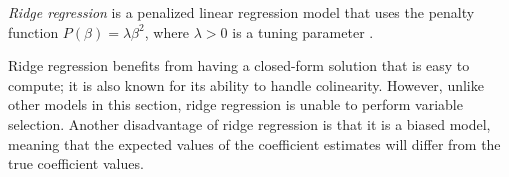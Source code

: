 \documentclass{article}
\newcommand{\argmin}[2]{\underset{#1}{\text{arg min}}\left\{#2\right\}}
\begin{document}

	
	\textit{Ridge regression} is a penalized linear regression model that uses the penalty function $P(\beta) = \lambda\beta^2$, where $\lambda > 0$ is a tuning parameter \cite{hoerl1970ridge}.

	Ridge regression benefits from having a closed-form solution that is easy to compute; it is also known for its ability to handle colinearity. However, unlike other models in this section, ridge regression is unable to perform variable selection. Another disadvantage of ridge regression is that it is a biased model, meaning that the expected values of the coefficient estimates will differ from the true coefficient values.
	
\end{document}
